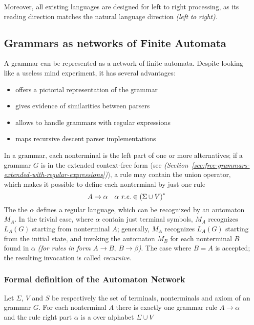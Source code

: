 \documentclass[english]{article}
\begin{document}
Moreover, all existing languages are designed for left to right processing, as its reading direction matches the natural language direction \textit{(left to right)}.

\subsection{Grammars as networks of Finite Automata}

A grammar can be represented as a network of finite automata.
Despite looking like a useless mind experiment, it has several advantages:

\begin{itemize}
  \item offers a pictorial representation of the grammar
  \item gives evidence of similarities between parsers
  \item allows to handle grammars with regular expressions
  \item maps recursive descent parser implementations
\end{itemize}

\bigskip
In a grammar, each nonterminal is the left part of one or more alternatives;
if a grammar \(G\) is in the extended context-free form (see \textit{(Section~\ref{sec:free-grammars-extended-with-regular-expressions})}), a rule \RP may contain the union operator, which makes it possible to define each nonterminal by just one rule
\[ A \rightarrow \alpha \quad \alpha \ \textit{r.e.} \in \left( \Sigma \cup V \right)^\ast \]
The the \re \(\alpha\) defines a regular language, which can be recognized by an automaton \(M_A\).
In the trivial case, where \(\alpha\) contain just terminal symbols, \(M_A\) recognizes \(L_A(G)\) starting from nonterminal \(A\);
generally, \(M_A\) recognizes \(L_A(G)\) starting from the initial state, and invoking the automaton \(M_{B}\) for each nonterminal \(B\) found in \(\alpha\) \textit{(for rules in form \(A \rightarrow B,\  B \rightarrow \beta\))}.
The case where \(B = A\) is accepted; the resulting invocation is called \textit{recursive}.

\subsubsection{Formal definition of the Automaton Network}

Let \(\Sigma\), \(V\) and \(S\) be respectively the set of terminals, nonterminals and axiom of an \EBNF grammar \(G\).
For each nonterminal \(A\) there is exactly one grammar rule \(A \rightarrow \alpha\) and the rule right part \(\alpha\) is a \re over alphabet \(\Sigma \cup V\)
\end{document}
